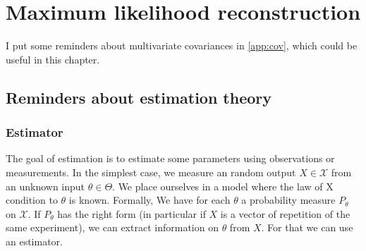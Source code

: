\documentclass[10pt,a4paper]{report}
\theoremstyle{plain}
\theoremstyle{definition}
\theoremstyle{remark}
\begin{document}













\chapter{Maximum likelihood reconstruction}

I put some reminders about multivariate covariances in
\cref{app:cov}, which could be useful in this chapter.

\section{Reminders about estimation theory}

\subsection{Estimator}

The goal of estimation is to estimate some parameters using observations or
measurements. In the simplest case, we measure an random output $X \in \mathcal{X}$ from an
unknown input $\theta \in \Theta$. We place ourselves in a model where the law
of X condition to $\theta$ is known. Formally, We have for each $\theta$ a
probability measure $P_\theta$ on $\mathcal{X}$. If $P_\theta$ has the right
form (in particular if $X$ is a vector of repetition of the same experiment), we
can extract information on $\theta$ from $X$. For that we can use an estimator.
\end{document}
